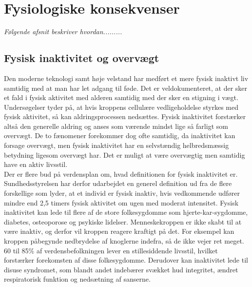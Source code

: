\section{Fysiologiske konsekvenser}
\textit{Følgende afsnit beskriver hvordan......... }

\subsection{Fysisk inaktivitet og overvægt}
Den moderne teknologi samt høje velstand har medført et mere fysisk inaktivt liv samtidig med at man har let adgang til føde\citep{Kiens2007}. Det er veldokumenteret, at der sker et fald i fysisk aktivitet med alderen samtidig med der sker en stigning i vægt\citep{Kaprio2008}. Undersøgelser tyder på, at hvis kroppens cellulære vedligeholdelse styrkes med fysisk aktivitet, så kan aldringsprocessen nedsættes\citep{Knight2012}. Fysisk inaktivitet forstærker altså den generelle aldring og anses som værende mindst lige så farligt som overvægt. De to fænomener forekommer dog ofte samtidig, da inaktivitet kan forsage overvægt, men fysisk inaktivitet har en selvstændig helbredsmæssig betydning ligesom overvægt har. Det er muligt at være overvægtig men samtidig have en aktiv livsstil.\citep{Kiens2007,Kaprio2008,Hjort1997}\\
Der er flere bud på verdensplan om, hvad definitionen for fysisk inaktivitet er. Sundhedsstyrelsen har derfor udarbejdet en generel definition ud fra de flere forskellige som lyder, at et individ er fysisk inaktiv, hvis vedkommende udfører mindre end 2,5 timers fysisk aktivitet om ugen med moderat intensitet.\citep{Kiens2007} Fysisk inaktivitet kan lede til flere af de store folkesygdomme som hjerte-kar-sygdomme, diabetes, osteoporose og psykiske lidelser. Menneskekroppen er ikke skabt til at være inaktiv, og derfor vil kroppen reagere kraftigt på det. For eksempel kan kroppen påbegynde nedbrydelse af knoglerne indefra, så de ikke vejer ret meget. 60 til 85\% af verdensbefolkningen lever en stillesiddende livsstil, hvilket forstærker forekomsten af disse folkesygdomme.\citep{Kiens2007,Reshma2002,Martini2012} Derudover kan inaktivitet lede til disuse syndromet, som blandt andet indebærer svækket hud integritet, ændret respiratorisk funktion og nedsætning af sanserne\citep{Knight2012,Mosby2009}. \\
